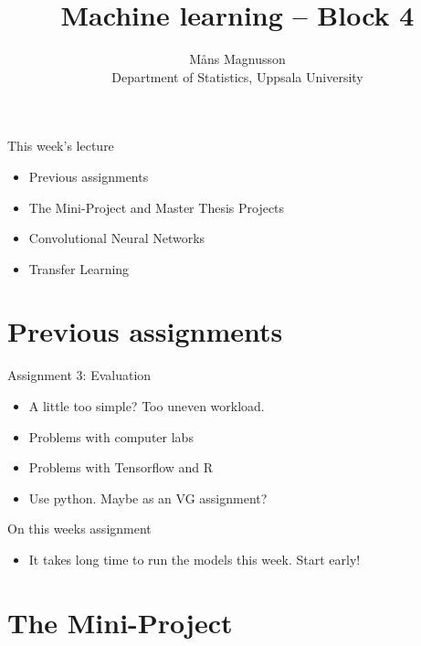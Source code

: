 \documentclass[10pt]{beamer}
\title[]{{\color{black}Machine learning -- Block 4}}
\author[]{M{\aa}ns Magnusson\\Department of Statistics, Uppsala University}
\date{\currentsemester}
\begin{document}
\frame{\titlepage
}



\begin{frame}{This week's lecture}
\begin{itemize}
\item Previous assignments
\item The Mini-Project and Master Thesis Projects
\item Convolutional Neural Networks
\item Transfer Learning
\end{itemize}
\end{frame}




\section{Previous assignments}

\begin{frame}{Assignment 3: Evaluation}

\begin{itemize}
\item A little too simple? Too uneven workload.
\item Problems with computer labs
\item Problems with Tensorflow and R
\item Use python. Maybe as an VG assignment?
\end{itemize}

\end{frame}

\begin{frame}{On this weeks assignment}
\begin{itemize}
\item It takes long time to run the models this week. Start early!
\end{itemize}
\end{frame}


\section{The Mini-Project}
\end{document}
